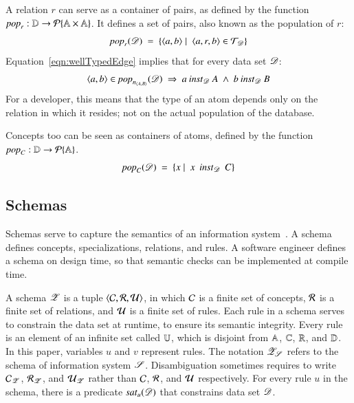 \documentclass{elsarticle}
\begin{document}
   A relation $r$ can serve as a container of pairs,
   as defined by the function $\text{\it pop\/}_r:\mathbb{D}\rightarrow\cal{P}\{\mathbb{A}\times\mathbb{A}\}$.
   It defines a set of pairs, also known as the population of $r$:
\begin{equation}
   \pop{r}{\dataset}\ =\ \{ \pair{a}{b}\mid\ \triple{a}{r}{b}\in\triples_{\dataset}\}
\label{eqn:pop-rel}
\end{equation}
   Equation~\ref{eqn:wellTypedEdge} implies that for every data set $\mathscr{D}$:
\[\pair{a}{b}\in\pop{\declare{n}{A}{B}}{\dataset}\ \Rightarrow\ a\inst_{\dataset}A\ \wedge\ b\inst_{\dataset}B\]
   For a developer, this means that the type of an atom depends only on the relation in which it resides; not on the actual population of the database.

   Concepts too can be seen as containers of atoms,
   defined by the function $\text{\it pop\/}_C:\mathbb{D}\rightarrow\cal{P}\{\mathbb{A}\}$.
\begin{equation}
   \pop{C}{\dataset}\ =\ \{ x\mid\ x\ \inst_{\dataset}\ C\}
\label{eqn:pop-concept}
\end{equation}

\subsection{Schemas}
\label{sct:Schemas}
   Schemas serve to capture the semantics of an information system~\cite{Spivak2012}.
   A schema defines concepts, specializations, relations, and rules.
   A software engineer defines a schema on design time, so that semantic checks can be implemented at compile time.

   A schema $\mathscr{Z}$ is a tuple $\langle{\mathcal{C}},{\mathcal{R}},{\mathcal{U}}\rangle$,
   in which $\mathcal{C}$ is a finite set of concepts,
   $\mathcal{R}$ is a finite set of relations,
   and $\mathcal{U}$ is a finite set of rules.
   Each rule in a schema serves to constrain the data set at runtime, to ensure its semantic integrity.
   Every rule is an element of an infinite set called $\mathbb{U}$,
   which is disjoint from $\mathbb{A}$, $\mathbb{C}$, $\mathbb{R}$, and $\mathbb{D}$.
   In this paper, variables $u$ and $v$ represent rules.
   The notation $\mathscr{Z}_{\mathscr{S}}$ refers to the schema of information system $\mathscr{S}$.
   Disambiguation sometimes requires to write $\mathcal{C}_{\mathscr{Z}}$, $\mathcal{R}_{\mathscr{Z}}$, and $\mathcal{U}_{\mathscr{Z}}$
   rather than $\mathcal{C}$, $\mathcal{R}$, and $\mathcal{U}$ respectively.
   For every rule $u$ in the schema, there is a predicate $\text{\it sat\/}_{u}(\mathscr{D})$ that constrains data set $\mathscr{D}$.
\end{document}
